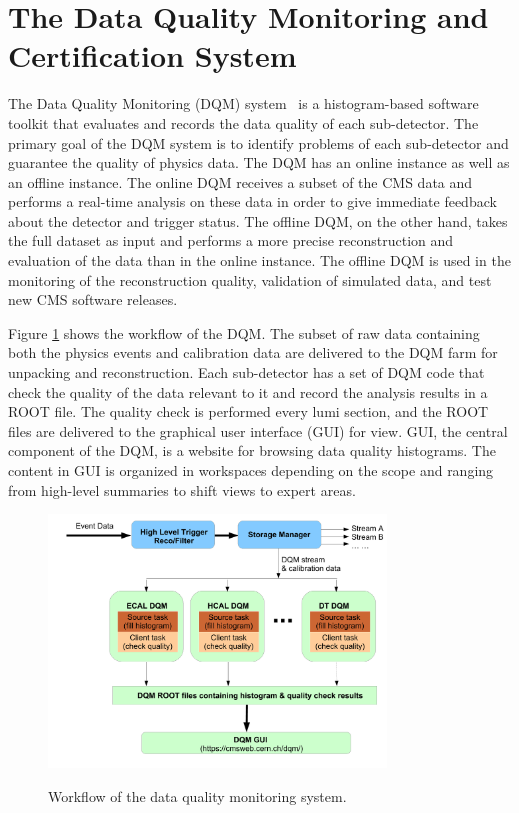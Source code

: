 \documentclass[thesis.tex]{subfiles}
\begin{document}
\section{The Data Quality Monitoring and Certification System}
The Data Quality Monitoring (DQM) system~\cite{DQMFEDE} is a histogram-based software toolkit that evaluates and records the data quality of each sub-detector.
The primary goal of the DQM system is to identify problems of each sub-detector and guarantee the quality of physics data. 
The DQM has an online instance as well as an offline instance. 
The online DQM receives a subset of the CMS data and performs a real-time analysis on these data in order to give immediate feedback about the detector and trigger status. 
The offline DQM, on the other hand, takes the full dataset as input and performs a more precise reconstruction and evaluation of the data than in the online instance.
The offline DQM is used in the monitoring of the reconstruction quality, validation of simulated data, and test new CMS software releases.

Figure \ref{fig:dqmworkflow} shows the workflow of the DQM. 
The subset of raw data containing both the physics events and calibration data are delivered to the DQM farm for unpacking and reconstruction.
Each sub-detector has a set of DQM code that check the quality of the data relevant to it and record the analysis results in a ROOT file.
The quality check is performed every lumi section, and the ROOT files are delivered to the graphical user interface (GUI) for view.
GUI, the central component of the DQM, is a website for browsing data quality histograms.
The content in GUI is organized in workspaces depending on the scope and ranging from high-level summaries to shift views to expert areas.  

\begin{figure}[hbtp]
	\centering
	\includegraphics[width=0.8\textwidth]{Fig/DQMFlow.pdf}
	\label{fig:dqmworkflow}
	\caption{Workflow of the data quality monitoring system.}
\end{figure}
\end{document}
